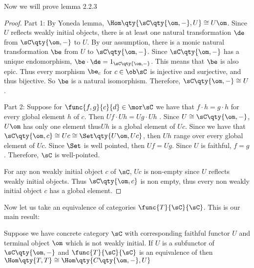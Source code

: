 \documentclass[../../main]{subfiles}
\begin{document}
Now we will prove lemma 2.2.3

\begin{proof}
	Part 1:
	By Yoneda lemma, $\Hom\qty{\sC\qty{\om,-},U} \cong U\om$. Since $U$ reflects
	weakly initial objects, there is at least one natural transformation $\de$
	from $\sC\qty{\om,-}$ to $U$. By our assumption, there is a monic natural
	transformation $\be$ from $U$ to $\sC\qty{\om,-}$. Since $\sC\qty{\om,-}$
	has a unique endomorphism, $\be \cdot \de = 1_{\sC\qty{\om,-}}$. This means
	that $\be$ is also epic. Thus every morphism $\be_{c}$ for $c \in \ob \sC$
	is injective and surjective, and thus bijective. So $\be$ is a natural
	isomorphism. Therefore, $\sC\qty{\om,-} \cong U$.

	Part 2: Suppose for $\func{f,g}{c}{d} \in \mor \sC$ we have that $f \cdot h
	= g \cdot h$ for every global element $h$ of $c$. Then $Uf \cdot Uh = Ug
	\cdot Uh$ .  Since $U \cong \sC\qty{\om,-}$,$U\om$ has only one element
	thus$Uh$ is a global element of $Uc$. Since we have that $\sC\qty{\om,c}
	\cong Uc \cong \Set\qty{U\om,Uc}$, then $Uh$ range over every global element
	of $Uc$. Since $\Set$ is well pointed, then $Uf = Ug$. Since $U$ is
	faithful, $f = g$. Therefore, $\sC$ is well-pointed.

	For any non weakly initial object $c$ of $\sC$, $Uc$ is non-empty since $U$
	reflects weakly initial objects. Thus $\sC\qty{\om,c}$ is non empty, thus
	every non weakly initial object $c$ has a global element.
\end{proof}

Now let us take an equivalence of categories $\func{T}{\sC}{\sC}$. This is our main result:

\begin{theorem}
	Suppose we have concrete category $\sC$ with corresponding faithful functor
	$U$ and terminal object $\om$ which is not weakly initial. If $U $ is a
	subfunctor of  $\sC\qty{\om,-}$ and $\func{T}{\sC}{\sC}$ is an equivalence
	of  then $\Hom\qty{T,T} \cong \Hom\qty{C\qty{\om,-},U }$
\end{theorem}
\end{document}
